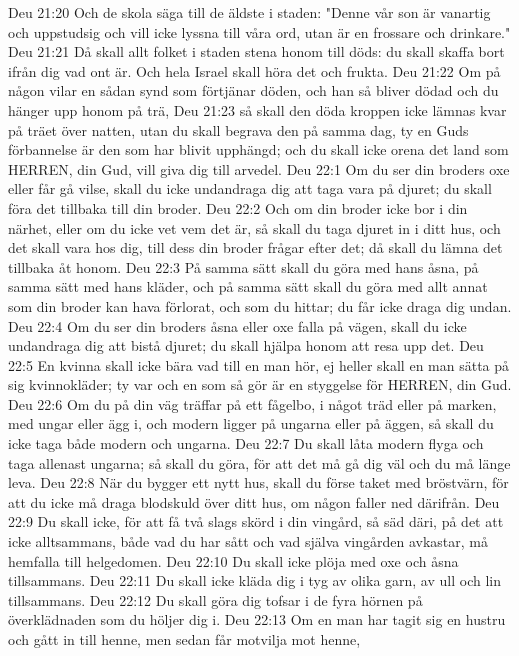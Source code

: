 Deu 21:20  Och de skola säga till de äldste i staden: "Denne vår son är vanartig och uppstudsig och vill icke lyssna till våra ord, utan är en frossare och drinkare."
Deu 21:21  Då skall allt folket i staden stena honom till döds: du skall skaffa bort ifrån dig vad ont är. Och hela Israel skall höra det och frukta.
Deu 21:22  Om på någon vilar en sådan synd som förtjänar döden, och han så bliver dödad och du hänger upp honom på trä,
Deu 21:23  så skall den döda kroppen icke lämnas kvar på träet över natten, utan du skall begrava den på samma dag, ty en Guds förbannelse är den som har blivit upphängd; och du skall icke orena det land som HERREN, din Gud, vill giva dig till arvedel.
Deu 22:1  Om du ser din broders oxe eller får gå vilse, skall du icke undandraga dig att taga vara på djuret; du skall föra det tillbaka till din broder.
Deu 22:2  Och om din broder icke bor i din närhet, eller om du icke vet vem det är, så skall du taga djuret in i ditt hus, och det skall vara hos dig, till dess din broder frågar efter det; då skall du lämna det tillbaka åt honom.
Deu 22:3  På samma sätt skall du göra med hans åsna, på samma sätt med hans kläder, och på samma sätt skall du göra med allt annat som din broder kan hava förlorat, och som du hittar; du får icke draga dig undan.
Deu 22:4  Om du ser din broders åsna eller oxe falla på vägen, skall du icke undandraga dig att bistå djuret; du skall hjälpa honom att resa upp det.
Deu 22:5  En kvinna skall icke bära vad till en man hör, ej heller skall en man sätta på sig kvinnokläder; ty var och en som så gör är en styggelse för HERREN, din Gud.
Deu 22:6  Om du på din väg träffar på ett fågelbo, i något träd eller på marken, med ungar eller ägg i, och modern ligger på ungarna eller på äggen, så skall du icke taga både modern och ungarna.
Deu 22:7  Du skall låta modern flyga och taga allenast ungarna; så skall du göra, för att det må gå dig väl och du må länge leva.
Deu 22:8  När du bygger ett nytt hus, skall du förse taket med bröstvärn, för att du icke må draga blodskuld över ditt hus, om någon faller ned därifrån.
Deu 22:9  Du skall icke, för att få två slags skörd i din vingård, så säd däri, på det att icke alltsammans, både vad du har sått och vad själva vingården avkastar, må hemfalla till helgedomen.
Deu 22:10  Du skall icke plöja med oxe och åsna tillsammans.
Deu 22:11  Du skall icke kläda dig i tyg av olika garn, av ull och lin tillsammans.
Deu 22:12  Du skall göra dig tofsar i de fyra hörnen på överklädnaden som du höljer dig i.
Deu 22:13  Om en man har tagit sig en hustru och gått in till henne, men sedan får motvilja mot henne,
